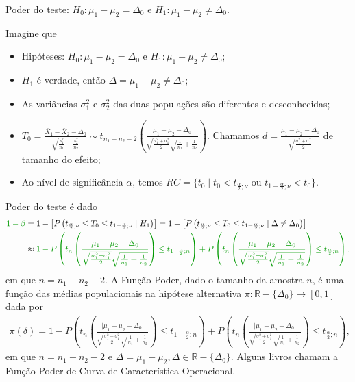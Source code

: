 \documentclass[9pt]{beamer}
\begin{document}
\begin{frame}{Poder do teste: $H_0:\mu_1 - \mu_2 = \Delta_0$ e $H_1: \mu_1 - \mu_2 \neq \Delta_0$.}

\tiny

Imagine que
\begin{itemize}
	\item Hipóteses: $H_0: \mu_1 - \mu_2 = \Delta_0$ e $H_1: \mu_1 -  \mu_2 \neq \Delta_0$;
	\item $H_1$ é verdade, então $\Delta = \mu_1-\mu_2 \neq \Delta_0$;
	\item As variâncias $\sigma_1^2$  e $\sigma_2^2$ das duas populações são diferentes e desconhecidas;
	\item $T_0 = \frac{\bar{X}_1 - \bar{X}_2 - \Delta_0}{ \sqrt{ \frac{s_1^2}{n_1} + \frac{s_2^2}{n_2} } } \sim t_{n_1+n_2-2}\left( \frac{\mu_1 - \mu_2 - \Delta_0}{\sqrt{\frac{\sigma_1^2 + \sigma_1^2}{2}} \sqrt{\frac{1}{n_1} + \frac{1}{n_2}}} \right)$. Chamamos $d = \frac{\mu_1 - \mu_2 - \Delta_0}{\sqrt{\frac{\sigma_1^2 + \sigma_1^2}{2}}}$ de tamanho do efeito;
	\item Ao nível de significância $\alpha$, temos $RC = \{ t_0 \mid t_0 < t_{\frac{\alpha}{2};\nu} \mbox{ ou } t_{1-\frac{\alpha}{2};\nu} < t_0  \}$.
\end{itemize}
\vfill	

Poder do teste é dado
\begin{align*}
\textcolor{important}{1-\beta} &=1 - \left[P\left( t_{\frac{\alpha}{2};\nu} \leq T_0 \leq t_{1-\frac{\alpha}{2};\nu} \mid H_1 \right)\right] = 1 - \left[P\left( t_{\frac{\alpha}{2};\nu} \leq T_0 \leq t_{1-\frac{\alpha}{2};\nu} \mid \Delta \neq \Delta_0 \right)\right]\\
&\approx \textcolor{important}{1 - P\left( t_{n}\left( \frac{\lvert \mu_1 - \mu_2 - \Delta_0 \rvert}{\sqrt{\frac{\sigma_1^2 + \sigma_1^2}{2}} \sqrt{\frac{1}{n_1} + \frac{1}{n_2}}} \right) \leq t_{1-\frac{\alpha}{2};n} \right)+P\left( t_{n}\left( \frac{\lvert \mu_1 - \mu_2 - \Delta_0 \rvert}{\sqrt{\frac{\sigma_1^2 + \sigma_1^2}{2}} \sqrt{\frac{1}{n_1} + \frac{1}{n_2}}} \right) \leq t_{\frac{\alpha}{2};n} \right).}
\end{align*}
em que $n = n_1 + n_2 - 2$. A \textcolor{important}{Função Poder}, dado o tamanho da amostra $n$, é uma função das médias populacionais na hipótese alternativa  $\pi: \mathbb{R} - \{\Delta_0\} \longrightarrow [0,1]$ dada por
\begin{align*}
\pi(\delta) = 1 - P\left( t_{n}\left( \frac{\lvert \mu_1 - \mu_2 - \Delta_0 \rvert}{\sqrt{\frac{\sigma_1^2 + \sigma_1^2}{2}} \sqrt{\frac{1}{n_1} + \frac{1}{n_2}}} \right) \leq t_{1-\frac{\alpha}{2};n} \right)+P\left( t_{n}\left( \frac{\lvert \mu_1 - \mu_2 - \Delta_0 \rvert}{\sqrt{\frac{\sigma_1^2 + \sigma_1^2}{2}} \sqrt{\frac{1}{n_1} + \frac{1}{n_2}}} \right) \leq t_{\frac{\alpha}{2};n} \right),
\end{align*}
em que $n=n_1+n_2-2$ e $\Delta = \mu_1 - \mu_2, \Delta \in \mathbb{R} - \{\Delta_0 \}$. Alguns livros chamam a Função Poder de \textcolor{important}{Curva de Característica Operacional.}

\normalsize

\end{frame}
\end{document}
